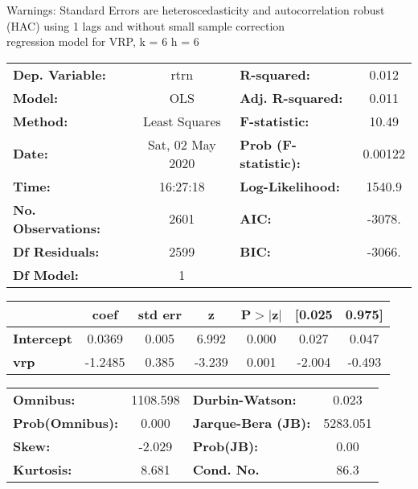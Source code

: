 Warnings: \newline
 [1] Standard Errors are heteroscedasticity and autocorrelation robust (HAC) using 1 lags and without small sample correction\\ 

regression model for VRP, k = 6 h = 6\begin{center}
\begin{tabular}{lclc}
\toprule
\textbf{Dep. Variable:}    &       rtrn       & \textbf{  R-squared:         } &     0.012   \\
\textbf{Model:}            &       OLS        & \textbf{  Adj. R-squared:    } &     0.011   \\
\textbf{Method:}           &  Least Squares   & \textbf{  F-statistic:       } &     10.49   \\
\textbf{Date:}             & Sat, 02 May 2020 & \textbf{  Prob (F-statistic):} &  0.00122    \\
\textbf{Time:}             &     16:27:18     & \textbf{  Log-Likelihood:    } &    1540.9   \\
\textbf{No. Observations:} &        2601      & \textbf{  AIC:               } &    -3078.   \\
\textbf{Df Residuals:}     &        2599      & \textbf{  BIC:               } &    -3066.   \\
\textbf{Df Model:}         &           1      & \textbf{                     } &             \\
\bottomrule
\end{tabular}
\begin{tabular}{lcccccc}
                   & \textbf{coef} & \textbf{std err} & \textbf{z} & \textbf{P$> |$z$|$} & \textbf{[0.025} & \textbf{0.975]}  \\
\midrule
\textbf{Intercept} &       0.0369  &        0.005     &     6.992  &         0.000        &        0.027    &        0.047     \\
\textbf{vrp}       &      -1.2485  &        0.385     &    -3.239  &         0.001        &       -2.004    &       -0.493     \\
\bottomrule
\end{tabular}
\begin{tabular}{lclc}
\textbf{Omnibus:}       & 1108.598 & \textbf{  Durbin-Watson:     } &    0.023  \\
\textbf{Prob(Omnibus):} &   0.000  & \textbf{  Jarque-Bera (JB):  } & 5283.051  \\
\textbf{Skew:}          &  -2.029  & \textbf{  Prob(JB):          } &     0.00  \\
\textbf{Kurtosis:}      &   8.681  & \textbf{  Cond. No.          } &     86.3  \\
\bottomrule
\end{tabular}
\end{center}

